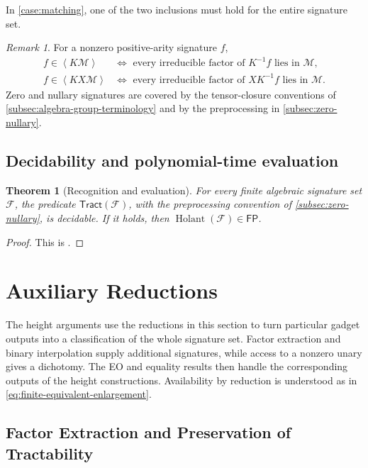 \documentclass[11pt,letterpaper,onecolumn]{article}
\theoremstyle{plain}
\newtheorem{theorem}{Theorem}[section]
\theoremstyle{definition}
\theoremstyle{remark}
\newtheorem{remark}[remark]{Remark}
\newcommand{\cF}{\mathcal F}
\newcommand{\cM}{\mathscr M}
\newcommand{\angles}[1]{\left\langle #1\right\rangle}
\newcommand{\Holant}{\operatorname{Holant}}
\newcommand{\Tract}{\mathsf{Tract}}
\newcommand{\FP}{\mathsf{FP}}
\begin{document}
In \cref{case:matching}, one of the two inclusions must hold for the
entire signature set.

	\begin{remark}
        For a nonzero positive-arity signature \(f\),
		\[
		\begin{aligned}
			f\in\angles{K\cM}
			&\Longleftrightarrow
			\text{ every irreducible factor of }K^{-1}f\text{ lies in }\cM,\\
			f\in\angles{KX\cM}
			&\Longleftrightarrow
			\text{ every irreducible factor of }XK^{-1}f\text{ lies in }\cM.
		\end{aligned}
		\]
		Zero and nullary signatures are covered by the tensor-closure
		conventions of \cref{subsec:algebra-group-terminology} and by the
		preprocessing in \cref{subsec:zero-nullary}.
	\end{remark}
	
	\subsection{Decidability and polynomial-time evaluation}
	\label{subsec:predicate-algorithms}

	
	\begin{theorem}[Recognition and evaluation]
		\label{thm:predicate-algorithms}
		For every finite algebraic signature set \(\cF\), the predicate \(\Tract(\cF)\),
		with the preprocessing convention of \cref{subsec:zero-nullary}, is
		decidable.  If it holds, then \(\Holant(\cF)\in\FP\).
	\end{theorem}
	
	\begin{proof}
		This is \cite[Theorem~2.22]{Liu2026DEQ2Holant}.
	\end{proof}
	
	
	\section{Auxiliary Reductions}
	\label{sec:mountain-terminals}
	
The height arguments use the reductions in this section to turn particular
gadget outputs into a classification of the whole signature set.  Factor
extraction and binary interpolation supply additional signatures, while
access to a nonzero unary gives a dichotomy.  The EO and equality results
then handle the corresponding outputs of the height constructions.
Availability by reduction is understood as in
\cref{eq:finite-equivalent-enlargement}.

	\subsection{Factor Extraction and Preservation of Tractability}
\label{subsec:dichotomy-decomposition-tools}
\label{sec:retained-normalization}
\end{document}
